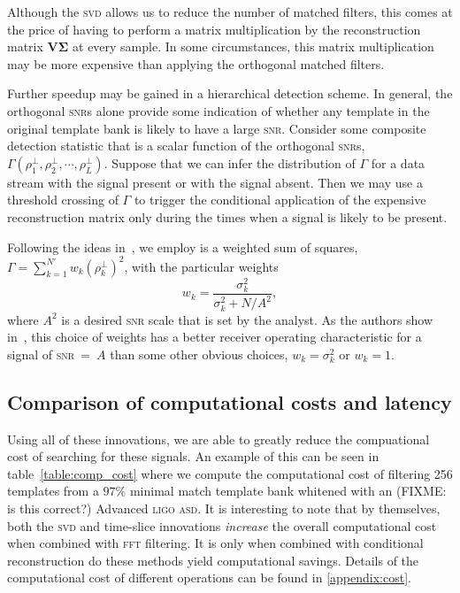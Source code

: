  Although the
\textsc{svd} allows us to reduce the number of matched filters, this comes at
the price of having to perform a matrix multiplication by the reconstruction
matrix $\mathbf {V \Sigma}$ at every sample.  In some circumstances, this
matrix multiplication may be more expensive than applying the orthogonal
matched filters.

Further speedup may be gained in a hierarchical detection scheme.  In general,
the orthogonal \textsc{snr}s alone provide some indication of whether any
template in the original template bank is likely to have a large \textsc{snr}.
Consider some composite detection statistic that is a scalar function of the
orthogonal \textsc{snr}s, $\Gamma(\rho_1^\perp, \rho_2^\perp, \cdots,
\rho_L^\perp)$.  Suppose that we can infer the distribution of $\Gamma$ for a
data stream with the signal present or with the signal absent.  Then we may use
a threshold crossing of $\Gamma$ to trigger the conditional application of the
expensive reconstruction matrix only during the times when a signal is likely
to be present.

Following the ideas in~\cite{Anderson:2000yy}, we employ is a weighted sum of
squares, $\Gamma = \sum_{k=1}^{N'} w_k (\rho_k^\perp) ^ 2$, with the particular
weights
%
\begin{equation}
%
w_k = \frac{\sigma_k^2}{\sigma_k^2 + N / A^2},
%
\end{equation}
%
where $A^2$ is a desired \textsc{snr} scale that is set by the analyst.  As the
authors show in~\cite{svd-compdetstat}, this choice of weights has a better
receiver operating characteristic for a signal of \textsc{snr}~=~$A$ than some
other obvious choices, $w_k = \sigma_k^2$ or $w_k = 1$.



\subsection{Comparison of computational costs and latency}

Using all of these innovations, we are able to greatly reduce the compuational
cost of searching for these signals. An example of this can be seen in
table~\ref{table:comp_cost} where we compute the computational cost of
filtering 256 templates from a $97\%$ minimal match template bank whitened with
an (FIXME: is this correct?) Advanced \textsc{ligo} \textsc{asd}. It is
interesting to note that by themselves, both the \textsc{svd} and time-slice
innovations \emph{increase} the overall computational cost when combined with
\textsc{fft} filtering. It is only when combined with conditional
reconstruction do these methods yield computational savings. Details of the
computational cost of different operations can be found in \ref{appendix:cost}.

